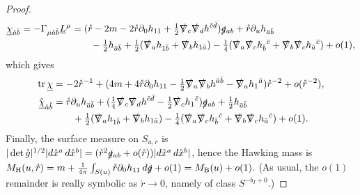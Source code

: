 \documentclass[reqno,11pt,letterpaper]{amsart}
\numberwithin{equation}{section}
\numberwithin{figure}{section}
\theoremstyle{definition}
\theoremstyle{remark}
\newcommand{\slg}{\slashed{g}{}}
\newcommand{\slnabla}{\slashed{\nabla}{}}
\newcommand{\tr}{\operatorname{tr}}
\newcommand{\pa}{\partial}
\newcommand{\ul}[1]{\underline{#1}{}}
\newcommand{\half}{\tfrac{1}{2}}
\begin{document}
\begin{proof}
  \begin{equation}
  \label{EqLBSHawkingChibar}
  \begin{split}
    \ul\chi_{\mathring a\mathring b} = -\Gamma_{\mu\mathring a\mathring b}\ul L^\mu &= (\mathring r-2 m-2\mathring r\pa_0 h_{1 1}+\half\slnabla_c\slnabla_d h^{\bar c\bar d})\slg_{a b} + \mathring r\pa_u h_{\bar a\bar b} \\
      &\qquad -\half h_{\bar a\bar b}+\half(\slnabla_a h_{1\bar b}+\slnabla_b h_{1\bar a})-\tfrac14(\slnabla_a\slnabla_c h_{\bar b}{}^{\bar c}+\slnabla_b\slnabla_c h_{\bar a}{}^{\bar c}) + o(1),
  \end{split}
  \end{equation}
  which gives
  \begin{equation}
  \label{EqLBSHawkingChibarHat}
  \begin{split}
    \tr\ul\chi &= -2\mathring r^{-1}+(4 m+4\mathring r\pa_0 h_{1 1}-\half\slnabla_a\slnabla_b h^{\bar a\bar b}-\slnabla_a h_1{}^{\bar a})\mathring r^{-2} + o(\mathring r^{-2}), \\
    \hat{\ul\chi}_{\mathring a\mathring b} &= \mathring r\pa_u h_{\bar a\bar b} + (\tfrac14 \slnabla_c\slnabla_d h^{\bar c\bar d}-\half\slnabla_c h_1{}^{\bar c})\slg_{a b}+\half h_{\bar a\bar b} \\
      &\qquad +\half(\slnabla_a h_{1\bar b}+\slnabla_b h_{1\bar a})-\tfrac14(\slnabla_a\slnabla_c h_{\bar b}{}^{\bar c}+\slnabla_b\slnabla_c h_{\bar a}{}^{\bar c}) + o(1).
  \end{split}
  \end{equation}
  Finally, the surface measure on $S_{u,\mathring r}$ is $|\det\mathring g|^{1/2}|d\mathring x^a\,d\mathring x^b|=(\mathring r^2\slg_{a b}+o(\mathring r))|d\mathring x^a\,d\mathring x^b|$, hence the Hawking mass is $M_{\rm H}(u,\mathring r)=m+\tfrac{1}{4\pi}\int_{S(u)}\mathring r\pa_0 h_{1 1}\,d\slg+o(1)=M_{\rm B}(u)+o(1)$. (As usual, the $o(1)$ remainder is really symbolic as $\mathring r\to 0$, namely of class $S^{-b_I+0}$.)
\end{proof}
\end{document}
